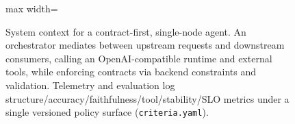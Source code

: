 \documentclass[11pt]{article}
\begin{document}
\begin{figure}[t]
\begin{adjustbox}{max width=\linewidth}
\end{adjustbox}
\caption{System context for a contract-first, single-node agent.
An orchestrator mediates between upstream requests and downstream consumers, calling an OpenAI-compatible runtime and external tools, while enforcing contracts via backend constraints and validation.
Telemetry and evaluation log structure/accuracy/faithfulness/tool/stability/SLO metrics under a single versioned policy surface (\texttt{criteria.yaml}).}
\label{fig:agent-context}
\end{figure}
\end{document}
